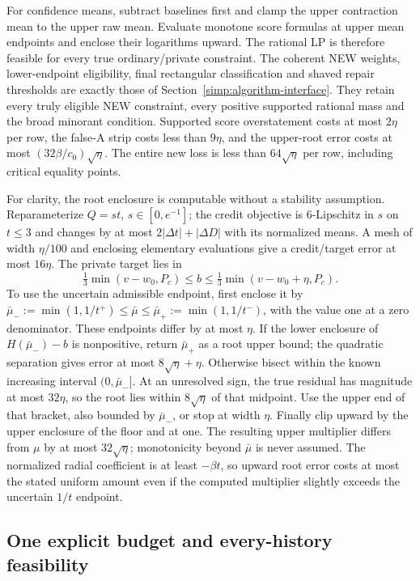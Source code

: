 For confidence means, subtract baselines first and clamp the upper
contraction mean to the upper raw mean. Evaluate monotone score formulas
at upper mean endpoints and enclose their logarithms upward. The rational
LP is therefore feasible for every true ordinary/private constraint.
The coherent NEW weights, lower-endpoint eligibility, final rectangular
classification and shaved repair thresholds are exactly those of
Section~\ref{simp:algorithm-interface}. They retain every truly eligible
NEW constraint, every positive supported rational mass and the broad
minorant condition. Supported score overstatement costs at most $2\eta$
per row, the false-A strip costs less than $9\eta$, and the upper-root
error costs at most $(32\beta/c_0)\sqrt\eta$. The entire new loss is
less than $64\sqrt\eta$ per row, including critical equality points.

For clarity, the root enclosure is computable without a stability
assumption. Reparameterize $Q=st$, $s\in[0,e^{-1}]$; the credit objective
is $6$-Lipschitz in $s$ on $t\le3$ and changes by at most
$2|\Delta t|+|\Delta D|$ with its normalized means. A mesh of width
$\eta/100$ and enclosing elementary evaluations give a credit/target
error at most $16\eta$. The private target lies in
\[
 \tfrac13\min(v-w_0,P_c)\le b\le
 \tfrac13\min(v-w_0+\eta,P_c).
\]
To use the uncertain admissible endpoint, first enclose it by
$\bar\mu_-:=\min(1,1/t^+)\le\bar\mu\le
\bar\mu_+:=\min(1,1/t^-)$, with the value one at a zero denominator.
These endpoints differ by at most $\eta$. If the lower enclosure of
$H(\bar\mu_-)-b$ is nonpositive, return $\bar\mu_+$ as a root upper
bound; the quadratic separation gives error at most $8\sqrt\eta+\eta$.
Otherwise bisect within the known increasing interval $(0,\bar\mu_-]$.
At an unresolved sign, the true residual has magnitude at most $32\eta$,
so the root lies within $8\sqrt\eta$ of that midpoint. Use the upper
end of that bracket, also bounded by $\bar\mu_-$, or stop at width $\eta$.
Finally clip upward by the upper enclosure of the floor and at one.
The resulting upper multiplier differs from $\mu$ by at most
$32\sqrt\eta$; monotonicity beyond $\bar\mu$ is never assumed.
The normalized radial coefficient is at least $-\beta t$, so upward
root error costs at most the stated uniform amount even if the
computed multiplier slightly exceeds the uncertain $1/t$ endpoint.

\subsection{One explicit budget and every-history feasibility}

